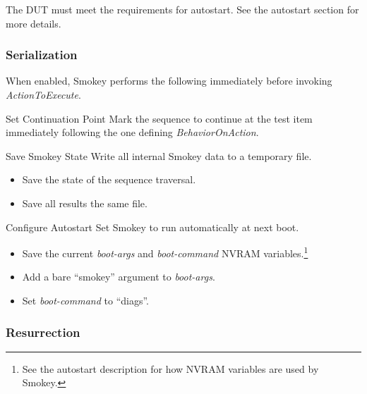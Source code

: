 \documentclass[11pt]{article}
\newcommand{\prop}[1]{{\itshape#1}}
\newcommand{\nvram}[1]{\mbox{\itshape#1}}
\newcommand{\nvarg}[1]{\mbox{``#1''}}
\begin{document}
The DUT must meet the requirements for autostart.  See the autostart section
for more details.

\subsubsection{Serialization}

When enabled, Smokey performs the following immediately before invoking
\prop{ActionToExecute}.

\begin{Definition}

\item[Set Continuation Point] Mark the sequence to continue at the test item
	immediately following the one defining \prop{BehaviorOnAction}.

\item[Save Smokey State] Write all internal Smokey data to a temporary file.

	\begin{itemize}

	\item Save the state of the sequence traversal.

	\item Save all results the same file.

	\end{itemize}

\item[Configure Autostart] Set Smokey to run automatically at next boot.

	\begin{itemize}

	\item Save the current \nvram{boot-args} and \nvram{boot-command} NVRAM
		variables.\footnote{See the autostart description for how
		NVRAM variables are used by Smokey.}

	\item Add a bare \nvarg{smokey} argument to \nvram{boot-args}.

	\item Set \nvram{boot-command} to \nvarg{diags}.

	\end{itemize}

\end{Definition}

\subsubsection{Resurrection}
\end{document}
